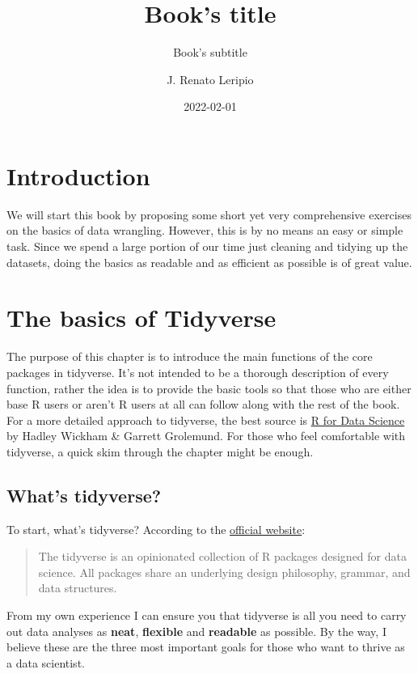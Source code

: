 \documentclass[
]{book}
\title{Book's title}
\subtitle{Book's subtitle}
\author{J. Renato Leripio}
\date{2022-02-01}
\begin{document}
\maketitle

{
\setcounter{tocdepth}{1}
\tableofcontents
}
\hypertarget{intro}{%
\chapter{Introduction}\label{intro}}

We will start this book by proposing some short yet very comprehensive exercises on the basics of data wrangling. However, this is by no means an easy or simple task. Since we spend a large portion of our time just cleaning and tidying up the datasets, doing the basics as readable and as efficient as possible is of great value.

\hypertarget{tidyverse}{%
\chapter{The basics of Tidyverse}\label{tidyverse}}

The purpose of this chapter is to introduce the main functions of the core packages in tidyverse. It's not intended to be a thorough description of every function, rather the idea is to provide the basic tools so that those who are either base R users or aren't R users at all can follow along with the rest of the book. For a more detailed approach to tidyverse, the best source is \href{https://r4ds.had.co.nz/}{R for Data Science} by Hadley Wickham \& Garrett Grolemund. For those who feel comfortable with tidyverse, a quick skim through the chapter might be enough.

\hypertarget{whats-tidyverse}{%
\section{What's tidyverse?}\label{whats-tidyverse}}

To start, what's tidyverse? According to the \href{https://www.tidyverse.org/}{official website}:

\begin{quote}
The tidyverse is an opinionated collection of R packages designed for data science. All packages share an underlying design philosophy, grammar, and data structures.
\end{quote}

From my own experience I can ensure you that tidyverse is all you need to carry out data analyses as \textbf{neat}, \textbf{flexible} and \textbf{readable} as possible. By the way, I believe these are the three most important goals for those who want to thrive as a data scientist.
\end{document}
